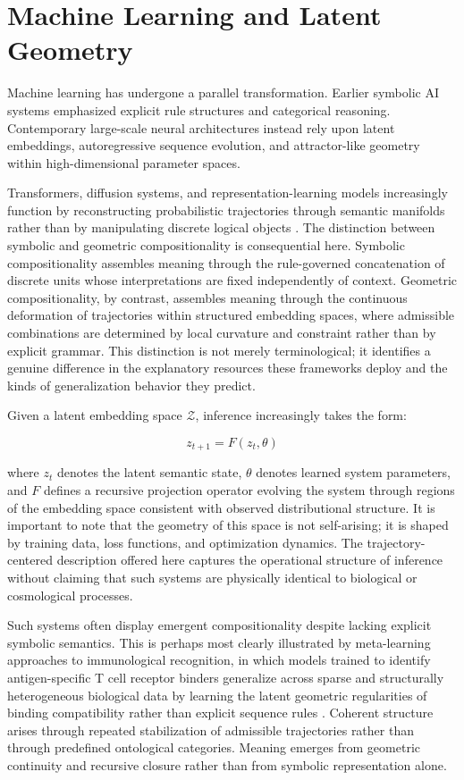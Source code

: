 \documentclass[12pt,a4paper]{article}
\begin{document}
\section{Machine Learning and Latent Geometry}

Machine learning has undergone a parallel transformation. Earlier symbolic AI systems
emphasized explicit rule structures and categorical reasoning. Contemporary large-scale
neural architectures instead rely upon latent embeddings, autoregressive sequence
evolution, and attractor-like geometry within high-dimensional parameter spaces.

Transformers, diffusion systems, and representation-learning models increasingly
function by reconstructing probabilistic trajectories through semantic manifolds rather
than by manipulating discrete logical objects \cite{Attention}. The distinction between
symbolic and geometric compositionality is consequential here. Symbolic compositionality
assembles meaning through the rule-governed concatenation of discrete units whose
interpretations are fixed independently of context. Geometric compositionality, by
contrast, assembles meaning through the continuous deformation of trajectories within
structured embedding spaces, where admissible combinations are determined by local
curvature and constraint rather than by explicit grammar. This distinction is not
merely terminological; it identifies a genuine difference in the explanatory resources
these frameworks deploy and the kinds of generalization behavior they predict.

Given a latent embedding space $\mathcal{Z}$, inference increasingly takes the form:

\[
z_{t+1} = F(z_t,\theta)
\]

where $z_t$ denotes the latent semantic state, $\theta$ denotes learned system
parameters, and $F$ defines a recursive projection operator evolving the system
through regions of the embedding space consistent with observed distributional
structure. It is important to note that the geometry of this space is not
self-arising; it is shaped by training data, loss functions, and optimization
dynamics. The trajectory-centered description offered here captures the operational
structure of inference without claiming that such systems are physically identical
to biological or cosmological processes.

Such systems often display emergent compositionality despite lacking explicit symbolic
semantics. This is perhaps most clearly illustrated by meta-learning approaches to
immunological recognition, in which models trained to identify antigen-specific T cell
receptor binders generalize across sparse and structurally heterogeneous biological
data by learning the latent geometric regularities of binding compatibility rather than
explicit sequence rules \cite{TCell}. Coherent structure arises through repeated
stabilization of admissible trajectories rather than through predefined ontological
categories. Meaning emerges from geometric continuity and recursive closure rather
than from symbolic representation alone.
\end{document}
